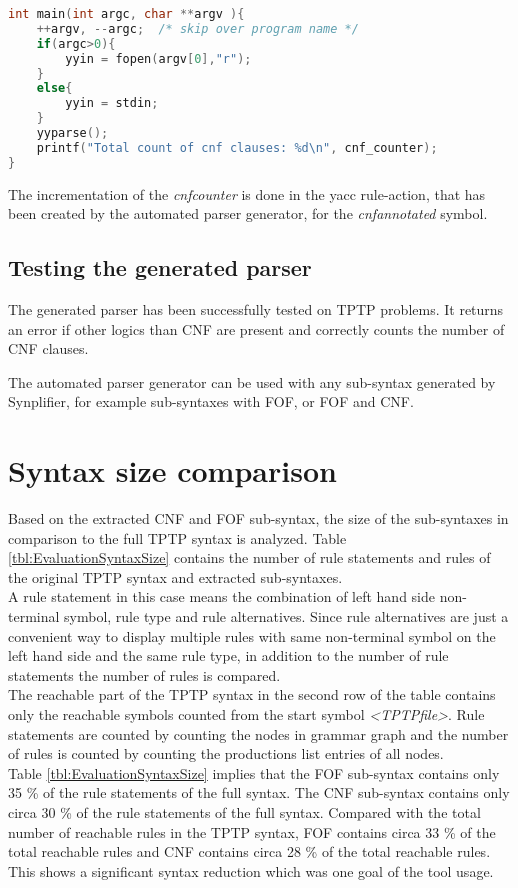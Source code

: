 \begin{lstlisting}[language=c, basicstyle=\scriptsize	,caption= \ac{CNF} parser main-function,label= lst:ValidationParserMainFunction]
 int main(int argc, char **argv ){
    ++argv, --argc;  /* skip over program name */
    if(argc>0){
        yyin = fopen(argv[0],"r");
    }
    else{
        yyin = stdin;
    }
    yyparse();
    printf("Total count of cnf clauses: %d\n", cnf_counter);
}
\end{lstlisting}
The incrementation of the \textit{cnf\textunderscore counter} is done in the yacc rule-action, that has been created  by the automated parser generator, for the \textit{cnf\textunderscore annotated} symbol.

\subsection{Testing the generated parser}\label{sec:ValidationAutomatedParserGeneration}
The generated parser has been successfully tested on \ac{TPTP} problems.
It returns an error if other logics than \ac{CNF} are present and correctly counts the number of \ac{CNF} clauses.

The automated parser generator can be used with any sub-syntax generated by \ac{Synplifier}, for example sub-syntaxes with \ac{FOF}, or \ac{FOF} and \ac{CNF}.

\section{Syntax size comparison}\label{sec:ValidationSyntaxSizeComparison}
Based on the extracted CNF and FOF sub-syntax, the size of the sub-syntaxes in comparison to the full TPTP syntax is analyzed.
Table \ref{tbl:EvaluationSyntaxSize} contains the number of rule statements and rules of the original TPTP syntax and extracted sub-syntaxes.\\
A rule statement in this case means the combination of left hand side non-terminal symbol, rule type and rule alternatives.
Since rule alternatives are just a convenient way to display multiple rules with same non-terminal symbol on the left hand side and the same rule type, in addition to the number of rule statements the number of rules is compared.\\
The reachable part of the TPTP syntax in the second row of the table contains only the reachable symbols counted from the start symbol \textit{\textless TPTP\textunderscore file\textgreater}. Rule statements are counted by counting the nodes in grammar graph and the number of rules is counted by counting the productions list entries of all nodes.\\
Table \ref{tbl:EvaluationSyntaxSize} implies that the FOF sub-syntax contains only 35 \% of the rule statements of the full syntax.
The CNF sub-syntax contains only circa 30 \% of the rule statements of the full syntax.
Compared with the total number of reachable rules in the TPTP syntax, FOF contains circa 33 \% of the total reachable rules and CNF contains circa  28 \% of the total reachable rules.
This shows a significant syntax reduction which was one goal of the tool usage.

